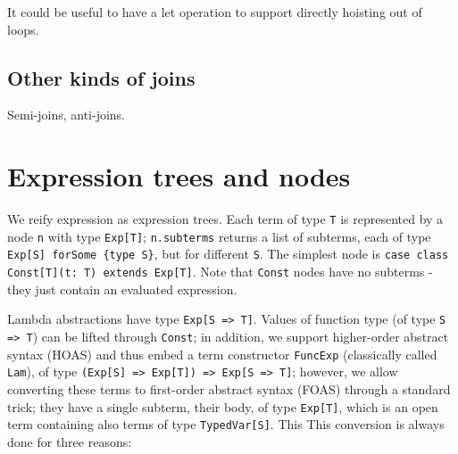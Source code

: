 \documentclass[preprint,authoryear,10pt]{sigplanconf}
\begin{document}
It could be useful to have a let operation to support directly hoisting
out of loops.

\subsection{Other kinds of joins}

Semi-joins, anti-joins.

%

\section{Expression trees and nodes}

We reify expression as expression trees. Each term of type \texttt{T} is
represented by a node \texttt{n} with type \texttt{Exp{[}T{]}};
\texttt{n.subterms} returns a list of subterms, each of type
\texttt{Exp{[}S{]} forSome \{type S\}}, but for different \texttt{S}.
The simplest node is
\texttt{case class Const{[}T{]}(t: T) extends Exp{[}T{]}}. Note that
\texttt{Const} nodes have no subterms - they just contain an evaluated
expression.

Lambda abstractions have type \texttt{Exp{[}S =\textgreater{} T{]}}.
Values of function type (of type \texttt{S =\textgreater{} T}) can be
lifted through \texttt{Const}; in addition, we support higher-order
abstract syntax (HOAS) and thus embed a term constructor
\texttt{FuncExp} (classically called \texttt{Lam}), of type
\texttt{(Exp{[}S{]} =\textgreater{} Exp{[}T{]}) =\textgreater{} Exp{[}S =\textgreater{} T{]}};
however, we allow converting these terms to first-order abstract syntax
(FOAS) through a standard trick; they have a single subterm, their body,
of type \texttt{Exp{[}T{]}}, which is an open term containing also terms
of type \texttt{TypedVar{[}S{]}}. This This conversion is always done
for three reasons:
\end{document}
